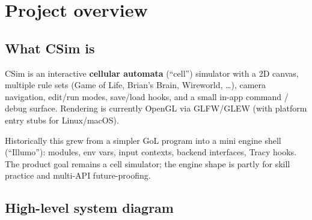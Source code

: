 \section{Project overview}
\label{sec:overview}

\subsection{What CSim is}
CSim is an interactive \textbf{cellular automata} (``cell'') simulator with a
2D canvas, multiple rule sets (Game of Life, Brian's Brain, Wireworld, \ldots),
camera navigation, edit/run modes, save/load hooks, and a small in-app command /
debug surface. Rendering is currently OpenGL via GLFW/GLEW (with platform
entry stubs for Linux/macOS).

\begin{inferencebox}
Historically this grew from a simpler GoL program into a mini engine shell
(``Illumo''): modules, env vars, input contexts, backend interfaces, Tracy hooks.
The product goal remains a cell simulator; the engine shape is partly for skill
practice and multi-API future-proofing.
\end{inferencebox}

\subsection{High-level system diagram}

\begin{center}
\end{center}

